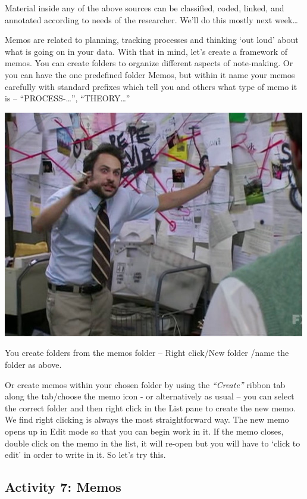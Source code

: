 \documentclass[
]{book}
\begin{document}
Material inside any of the above sources can be classified, coded, linked, and annotated according to needs of the researcher. We'll do this mostly next week\ldots{}

Memos are related to planning, tracking processes and thinking `out loud' about what is going on in your data. With that in mind, let's create a framework of memos. You can create folders to organize different aspects of note-making. Or you can have the one predefined folder Memos, but within it name your memos carefully with standard prefixes which tell you and others what type of memo it is -- ``PROCESS-\ldots{}'', ``THEORY\ldots{}''

\includegraphics{imgs/memos.jpg}

You create folders from the memos folder -- Right click/New folder /name the folder as above.

Or create memos within your chosen folder by using the \emph{``Create''} ribbon tab along the tab/choose the memo icon - or alternatively as usual -- you can select the correct folder and then right click in the List pane to create the new memo. We find right clicking is always the most straightforward way. The new memo opens up in Edit mode so that you can begin work in it. If the memo closes, double click on the memo in the list, it will re-open but you will have to `click to edit' in order to write in it. So let's try this.

\hypertarget{activity-7-memos}{%
\subsection{Activity 7: Memos}\label{activity-7-memos}}
\end{document}
